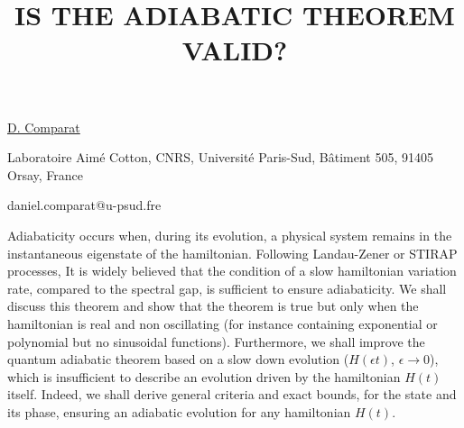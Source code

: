 \title{IS THE ADIABATIC THEOREM VALID?}

\underline{D. Comparat} 

{\normalsize{\vspace{-4mm}
Laboratoire Aim\'e Cotton, CNRS, Universit\'e Paris-Sud, B\^atiment 505, 91405 Orsay, France

\email daniel.comparat@u-psud.fre}}

Adiabaticity occurs when, during its evolution, a physical system remains in the instantaneous
eigenstate of the hamiltonian. Following Landau-Zener or STIRAP processes, It is widely believed that the condition of a slow hamiltonian variation rate, compared to the spectral gap, is sufficient to ensure adiabaticity. We shall discuss this theorem and show that the theorem is true but only when the hamiltonian is real and non oscillating (for instance containing exponential or polynomial but no sinusoidal functions). Furthermore, we shall improve the quantum adiabatic theorem based on a slow down evolution ($H(\epsilon t)$, $\epsilon \rightarrow 0$), which is insufficient to describe an evolution driven by the hamiltonian $H(t)$ itself. Indeed, we shall derive general criteria and exact bounds, for the state and its phase, ensuring an adiabatic evolution for any hamiltonian $H(t)$.

\vspace{\baselineskip} 